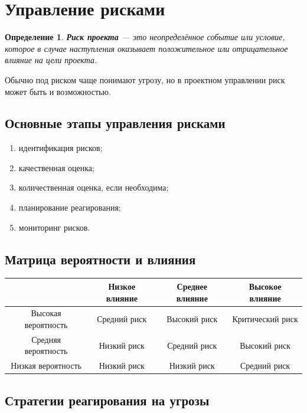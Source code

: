 \documentclass[12pt,a4paper]{article}
\newtheorem{definition}{Определение}
\begin{document}
\section{Управление рисками}

\begin{definition}
\textbf{Риск проекта} --- это неопределённое событие или условие, которое в случае наступления оказывает положительное или отрицательное влияние на цели проекта.
\end{definition}

Обычно под риском чаще понимают угрозу, но в проектном управлении риск может быть и возможностью.

\subsection{Основные этапы управления рисками}

\begin{enumerate}
    \item идентификация рисков;
    \item качественная оценка;
    \item количественная оценка, если необходима;
    \item планирование реагирования;
    \item мониторинг рисков.
\end{enumerate}

\subsection{Матрица вероятности и влияния}

\begin{center}
\begin{tabular}{|c|c|c|c|}
\hline
 & Низкое влияние & Среднее влияние & Высокое влияние \\
\hline
Высокая вероятность & Средний риск & Высокий риск & Критический риск \\
\hline
Средняя вероятность & Низкий риск & Средний риск & Высокий риск \\
\hline
Низкая вероятность & Низкий риск & Низкий риск & Средний риск \\
\hline
\end{tabular}
\end{center}

\subsection{Стратегии реагирования на угрозы}
\end{document}

